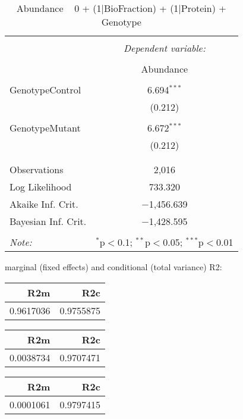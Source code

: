 \documentclass[11pt]{report}
\begin{document}
\begin{table}[!htbp] \centering 
  \caption{Abundance ~ 0 + (1|BioFraction) + (1|Protein) + Genotype} 
  \label{} 
\begin{tabular}{@{\extracolsep{5pt}}lc} 
\\[-1.8ex]\hline 
\hline \\[-1.8ex] 
 & \multicolumn{1}{c}{\textit{Dependent variable:}} \\ 
\cline{2-2} 
\\[-1.8ex] & Abundance \\ 
\hline \\[-1.8ex] 
 GenotypeControl & 6.694$^{***}$ \\ 
  & (0.212) \\ 
  & \\ 
 GenotypeMutant & 6.672$^{***}$ \\ 
  & (0.212) \\ 
  & \\ 
\hline \\[-1.8ex] 
Observations & 2,016 \\ 
Log Likelihood & 733.320 \\ 
Akaike Inf. Crit. & $-$1,456.639 \\ 
Bayesian Inf. Crit. & $-$1,428.595 \\ 
\hline 
\hline \\[-1.8ex] 
\textit{Note:}  & \multicolumn{1}{r}{$^{*}$p$<$0.1; $^{**}$p$<$0.05; $^{***}$p$<$0.01} \\ 
\end{tabular} 
\end{table} 
marginal (fixed effects) and conditional (total variance) R2:

\begin{tabular}{r|r}
\hline
R2m & R2c\\
\hline
0.9617036 & 0.9755875\\
\hline
\end{tabular}

\begin{tabular}{r|r}
\hline
R2m & R2c\\
\hline
0.0038734 & 0.9707471\\
\hline
\end{tabular}

\begin{tabular}{r|r}
\hline
R2m & R2c\\
\hline
0.0001061 & 0.9797415\\
\hline
\end{tabular}
\end{document}
